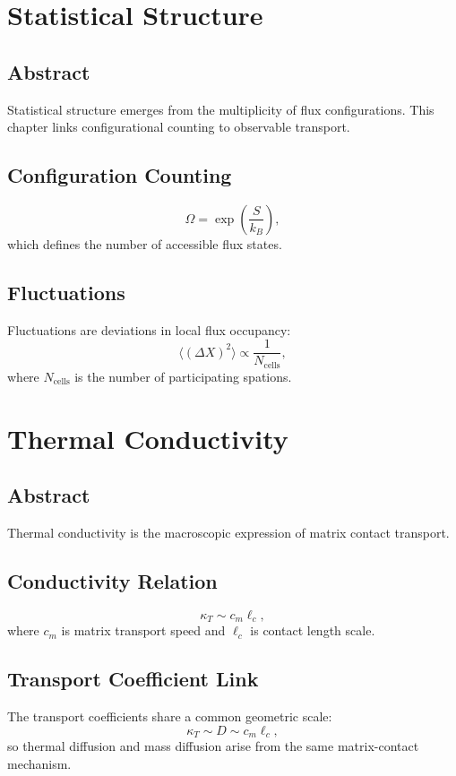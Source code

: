 \documentclass[12pt]{book}
\begin{document}
\chapter{Statistical Structure}

\section*{Abstract}
Statistical structure emerges from the multiplicity of flux configurations. This chapter links
configurational counting to observable transport.

\section{Configuration Counting}
\begin{equation}
\Omega = \exp\left(\frac{S}{k_B}\right),
\end{equation}
which defines the number of accessible flux states.

\section{Fluctuations}
Fluctuations are deviations in local flux occupancy:
\begin{equation}
\langle (\Delta X)^2 \rangle \propto \frac{1}{N_{\text{cells}}},
\end{equation}
where $N_{\text{cells}}$ is the number of participating spations.

\chapter{Thermal Conductivity}

\section*{Abstract}
Thermal conductivity is the macroscopic expression of matrix contact transport.

\section{Conductivity Relation}
\begin{equation}
\kappa_T \sim c_m \ell_c,
\end{equation}
where $c_m$ is matrix transport speed and $\ell_c$ is contact length scale.

\section{Transport Coefficient Link}
The transport coefficients share a common geometric scale:
\begin{equation}
\kappa_T \sim D \sim c_m \ell_c,
\end{equation}
so thermal diffusion and mass diffusion arise from the same matrix-contact mechanism.
\end{document}
